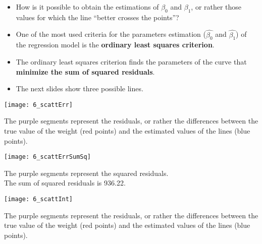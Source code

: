 \begin{frame}
  \vspace{0.25cm}
  \begin{itemize}
    \item How is it possible to obtain the estimations of $ \beta_0 $ and $ \beta_1 $, or rather those values for which the line ``better crosses the points''?
    \vspace{0.75cm}
    \item One of the most used criteria for the parameters estimation ($ \hat{\beta_0} $ and $ \hat{\beta_1} $) of the regression model is the \textbf{ordinary least squares criterion}.
    \vspace{0.5cm}
    \item The ordinary least squares criterion finds the parameters of the curve that \textbf{minimize the sum of squared residuals}.
    \vspace{0.75cm}
    \item The next slides show three possible lines.
  \end{itemize}
\end{frame}

\begin{frame}
  \begin{center}
    \texttt{[image: 6\_scattErr]}
  \end{center}
  \vspace{-0.4cm}
  \begin{small}
    The purple segments represent the residuals, or rather the differences between the true value of the weight (red points) and the estimated values of the lines (blue points).
  \end{small}
\end{frame}

\begin{frame}
  \begin{center}
    \texttt{[image: 6\_scattErrSumSq]}
  \end{center}
  \vspace{-0.4cm}
  \begin{small}
    The purple segments represent the squared residuals. \\
    The sum of squared residuals is 936.22.
  \end{small}
\end{frame}

\begin{frame}
  \begin{center}
    \texttt{[image: 6\_scattInt]}
  \end{center}
  \vspace{-0.4cm}
  \begin{small}
    The purple segments represent the residuals, or rather the differences between the true value of the weight (red points) and the estimated values of the lines (blue points).
  \end{small}
\end{frame}

